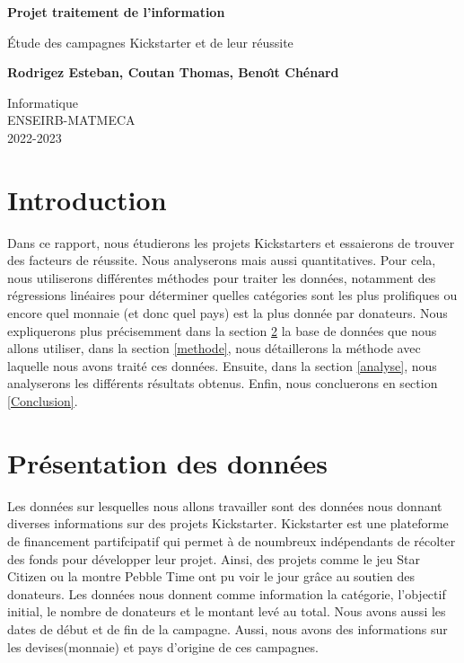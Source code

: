 \documentclass{article}
\begin{document}
\begin{titlepage}
    \begin{center}
        \vspace*{6cm}
 
        \textbf{\huge{Projet traitement de l'information}}
 
        \vspace{0.5cm}
        \large{\'Etude des campagnes Kickstarter et de leur r\'eussite}
             
        \vspace{1.5cm}
 
        \textbf{Rodrigez Esteban, Coutan Thomas, Beno\^\i t Ch\'enard}
 
        \vfill
        Informatique\\
        ENSEIRB-MATMECA\\
        2022-2023 
    \end{center}
 \end{titlepage}

\renewcommand\contentsname{Table des mati\`eres}
\tableofcontents
\newpage

\section{Introduction}

\tabto{1cm} Dans ce rapport, nous étudierons les projets Kickstarters et essaierons de trouver des facteurs de réussite. Nous analyserons mais aussi quantitatives.
Pour cela, nous utiliserons différentes méthodes pour traiter les données, notamment des régressions linéaires pour déterminer quelles catégories sont les plus prolifiques ou encore quel monnaie (et donc quel pays) est la plus donnée par donateurs.
\tabto{1cm} Nous expliquerons plus précisemment dans la section \ref{donnees} la base de données que nous allons utiliser, dans la section \ref{methode}, nous détaillerons la méthode avec laquelle nous avons traité ces données.
Ensuite, dans la section \ref{analyse}, nous analyserons les différents résultats obtenus. Enfin, nous concluerons en section \ref{Conclusion}. 

\section{Présentation des données}
\label{donnees}
\tabto{1cm} Les données sur lesquelles nous allons travailler sont des données nous donnant diverses informations sur des projets Kickstarter. Kickstarter est une plateforme de financement partifcipatif qui permet à de noumbreux indépendants de récolter des fonds pour développer 
leur projet. Ainsi, des projets comme le jeu Star Citizen ou la montre Pebble Time ont pu voir le jour grâce au soutien des donateurs. Les données nous donnent comme information la catégorie, l'objectif initial, le nombre de donateurs et le montant levé au total. Nous avons aussi les dates de début et de fin de la campagne.
Aussi, nous avons des informations sur les devises(monnaie) et pays d'origine de ces campagnes.
\end{document}
